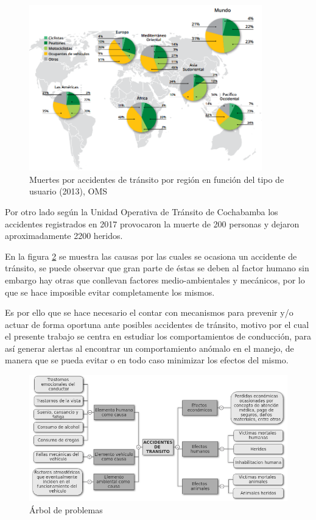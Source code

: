 \begin{figure}[h!]
  \begin{center}	\includegraphics[width=0.9\textwidth, fbox]{imagenes/Cap1/oms1}
  \caption{Muertes por accidentes de tránsito por regi\'{o}n en función del tipo de usuario (2013), OMS}
  \label{fig:oms}  
  \end{center}
\end{figure}

Por otro lado seg\'{u}n la Unidad Operativa de Tr\'{a}nsito de Cochabamba los accidentes registrados en 2017 provocaron la muerte de 200 personas y dejaron aproximadamente 2200 heridos.
	
\vspace{5mm} %

En la figura \ref{fig:arbol} se muestra las causas por las cuales se ocasiona un accidente de tr\'{a}nsito, se puede observar que gran parte de \'{e}stas se deben al factor humano sin embargo hay otras que conllevan factores medio-ambientales y mec\'{a}nicos, por lo que se hace imposible evitar completamente los mismos. 

\vspace{5mm} %

Es por ello que se hace necesario el contar con mecanismos para prevenir y/o actuar de forma oportuna ante posibles accidentes de tr\'{a}nsito, motivo por el cual el presente trabajo se centra en estudiar los comportamientos de conducci\'{o}n, para as\'{i} generar alertas al encontrar un comportamiento an\'{o}malo en el manejo, de manera que se pueda evitar o en todo caso minimizar los efectos del mismo.

\begin{figure}[h!]
  \begin{center}	\includegraphics[width=1.0\textwidth, fbox]{imagenes/Cap1/arbol_p}
  \caption{\'{A}rbol de problemas}
  \label{fig:arbol}
  \end{center}
\end{figure}

